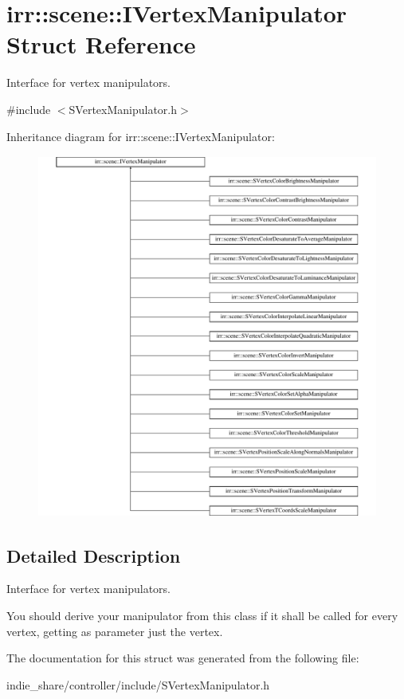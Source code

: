 \hypertarget{structirr_1_1scene_1_1IVertexManipulator}{}\section{irr\+:\+:scene\+:\+:I\+Vertex\+Manipulator Struct Reference}
\label{structirr_1_1scene_1_1IVertexManipulator}


Interface for vertex manipulators.  




{\ttfamily \#include $<$S\+Vertex\+Manipulator.\+h$>$}

Inheritance diagram for irr\+:\+:scene\+:\+:I\+Vertex\+Manipulator\+:\begin{figure}[H]
\begin{center}
\leavevmode
\includegraphics[height=12.000000cm]{structirr_1_1scene_1_1IVertexManipulator}
\end{center}
\end{figure}


\subsection{Detailed Description}
Interface for vertex manipulators. 

You should derive your manipulator from this class if it shall be called for every vertex, getting as parameter just the vertex. 

The documentation for this struct was generated from the following file\+:\begin{DoxyCompactItemize}
\item 
indie\+\_\+share/controller/include/S\+Vertex\+Manipulator.\+h\end{DoxyCompactItemize}

